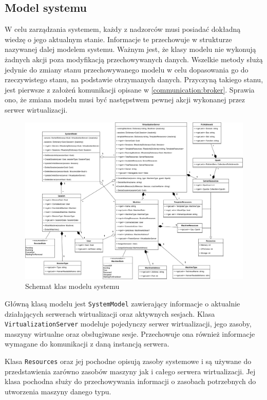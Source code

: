 \documentclass[../opis-rozwiazania.tex]{subfiles}
\begin{document}
\subsection{Model systemu}

W celu zarządzania systemem, każdy z nadzorców musi posiadać dokładną wiedzę o jego aktualnym stanie. Informacje te przechowuje w strukturze nazywanej dalej modelem systemu. Ważnym jest, że klasy modelu nie wykonują żadnych akcji poza modyfikacją przechowywanych danych. Wszelkie metody służą jedynie do zmiany stanu przechowywanego modelu w celu dopasowania go do rzeczywistego stanu, na podstawie otrzymanych danych. Przyczyną takiego stanu, jest pierwsze z założeń komunikacji opisane w \ref{communication:broker}. Sprawia ono, że zmiana modelu musi być następstwem pewnej akcji wykonanej przez serwer wirtualizacji.

\begin{figure}[H]
    \centering
    \includegraphics[width=\textwidth]{../diagrams/class_diagrams/system_model_v2.png}
    \caption{Schemat klas modelu systemu}
\end{figure}

Główną klasą modelu jest \texttt{SystemModel} zawierający informacje o aktualnie działających serwerach wirtualizacji oraz aktywnych sesjach. Klasa \texttt{VirtualizationServer} modeluje pojedynczy serwer wirtualizacji, jego zasoby, maszyny wirtualne oraz obsługiwane sesje. Przechowuje ona również informacje wymagane do komunikacji z daną instancją serwera.

Klasa \texttt{Resources} oraz jej pochodne opisują zasoby systemowe i są używane do przedstawienia zarówno zasobów maszyny jak i całego serwera wirtualizacji. Jej klasa pochodna \texttt{} służy do przechowywania informacji o zasobach potrzebnych do utworzenia maszyny danego typu.
\end{document}
